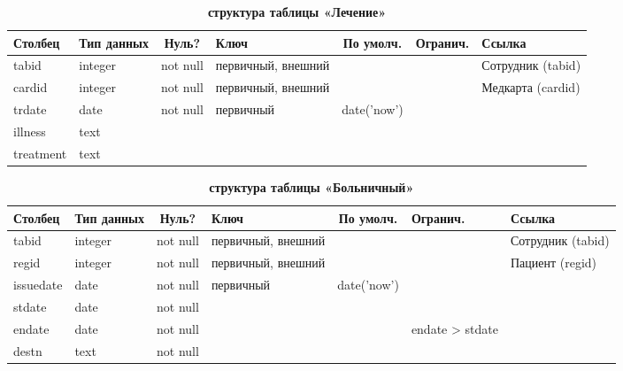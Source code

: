 \documentclass[14pt,a4paper,russian]{extreport}
\begin{document}
\begin{table}[h]
    \caption{ } 
    \begin{subtable}[t]{\textwidth}
        \caption{\textbf{структура таблицы «Лечение»}}
    \begin{tabularx}{\textwidth}{| X | X | c | X | c | c | X |}
        \hline
        \textbf{Столбец} & \textbf{Тип данных} & \textbf{Нуль?} & \textbf{Ключ} & \textbf{По
        умолч.} & \textbf{Огранич.} & \textbf{Ссылка} \\ \hline
        tabid & integer & not null & первичный, внешний & & & Сотрудник (tabid) \\ \hline
        cardid & integer & not null & первичный, внешний & & & Медкарта (cardid) \\ \hline
        trdate & date & not null & первичный & date('now') & & \\ \hline 
        illness & text & & & & & \\ \hline
        treatment & text & & & & & \\ \hline
    \end{tabularx}
    \end{subtable}
    \label{table:treat}
\end{table}

\cleardoublepage
\begin{table}[t!]
    \caption{ } 
    \begin{subtable}[t]{\textwidth}
        \caption{\textbf{структура таблицы «Больничный»}}
    \begin{tabularx}{\textwidth}{| X | X | c | X | c | X | X |}
        \hline
        \textbf{Столбец} & \textbf{Тип данных} & \textbf{Нуль?} & \textbf{Ключ} & \textbf{По
        умолч.} & \textbf{Огранич.} & \textbf{Ссылка} \\ \hline
            tabid & integer & not null & первичный, внешний & & & Сотрудник (tabid) \\ \hline

            regid & integer & not null & первичный, внешний & & & Пациент (regid)\\ \hline
            issuedate & date & not null & первичный & date('now') & & \\ \hline
        stdate & date & not null & & & & \\ \hline
        endate & date & not null & & & endate > stdate & \\ \hline
        destn & text & not null & & & & \\ \hline
    \end{tabularx}
    \end{subtable}
    \label{table:sickleave}
\end{table}
\end{document}
